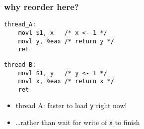
\begin{frame}[fragile]\frametitle{why reorder here?}
\begin{minipage}{0.45\textwidth}
\begin{lstlisting}[language=myasm,style=smaller]
thread_A:
    movl $1, x   /* x <- 1 */
    movl y, %eax /* return y */
    ret
\end{lstlisting}
\end{minipage}
\begin{minipage}{0.45\textwidth}
\begin{lstlisting}[language=myasm,style=smaller]
thread_B:
    movl $1, y   /* y <- 1 */
    movl x, %eax /* return x */
    ret
\end{lstlisting}
\end{minipage}
\begin{itemize}
\item thread A: faster to load \texttt{y} right now!
\item \ldots rather than wait for write of \texttt{x} to finish
\end{itemize}
\end{frame}


